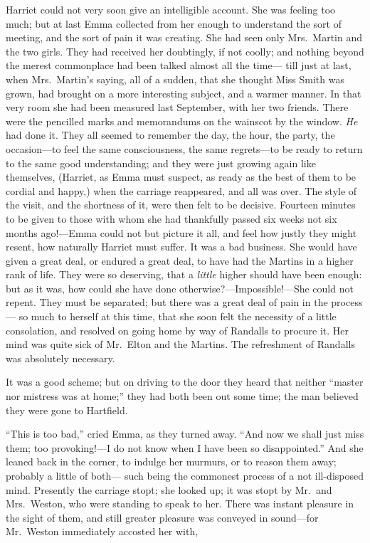 Harriet could not very soon give an intelligible account.
She was feeling too much; but at last Emma collected from her
enough to understand the sort of meeting, and the sort of pain it
was creating.  She had seen only Mrs.\ Martin and the two girls.
They had received her doubtingly, if not coolly; and nothing
beyond the merest commonplace had been talked almost all the time---%
till just at last, when Mrs.\ Martin's saying, all of a sudden,
that she thought Miss Smith was grown, had brought on a more
interesting subject, and a warmer manner.  In that very room
she had been measured last September, with her two friends.
There were the pencilled marks and memorandums on the wainscot by
the window.  \emph{He} had done it.  They all seemed to remember the day,
the hour, the party, the occasion---to feel the same consciousness,
the same regrets---to be ready to return to the same good understanding;
and they were just growing again like themselves, (Harriet, as Emma
must suspect, as ready as the best of them to be cordial and happy,)
when the carriage reappeared, and all was over.  The style of
the visit, and the shortness of it, were then felt to be decisive.
Fourteen minutes to be given to those with whom she had thankfully
passed six weeks not six months ago!---Emma could not but picture
it all, and feel how justly they might resent, how naturally
Harriet must suffer.  It was a bad business.  She would have given
a great deal, or endured a great deal, to have had the Martins
in a higher rank of life.  They were so deserving, that a \emph{little}
higher should have been enough:  but as it was, how could she have
done otherwise?---Impossible!---She could not repent.  They must
be separated; but there was a great deal of pain in the process---%
so much to herself at this time, that she soon felt the necessity
of a little consolation, and resolved on going home by way of Randalls
to procure it.  Her mind was quite sick of Mr.\ Elton and the Martins.
The refreshment of Randalls was absolutely necessary.

It was a good scheme; but on driving to the door they heard
that neither ``master nor mistress was at home;'' they had both
been out some time; the man believed they were gone to Hartfield.

``This is too bad,'' cried Emma, as they turned away.  ``And now we
shall just miss them; too provoking!---I do not know when I have been
so disappointed.''  And she leaned back in the corner, to indulge
her murmurs, or to reason them away; probably a little of both---%
such being the commonest process of a not ill-disposed mind.
Presently the carriage stopt; she looked up; it was stopt
by Mr.\ and Mrs.\ Weston, who were standing to speak to her.
There was instant pleasure in the sight of them, and still greater
pleasure was conveyed in sound---for Mr.\ Weston immediately accosted
her with,

